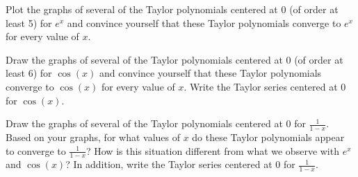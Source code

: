 \begin{activity} \label{8.5.Act3}
\ba
\item Plot the graphs of several of the Taylor polynomials centered at 0 (of order at least 5) for $e^x$ and convince yourself that these Taylor polynomials converge to $e^x$ for every value of $x$.
\item Draw the graphs of several of the Taylor polynomials centered at 0 (of order at least 6) for $\cos(x)$ and convince yourself that these Taylor polynomials converge to $\cos(x)$ for every value of $x$. Write the Taylor series centered at 0 for $\cos(x)$.
\item Draw the graphs of several of the Taylor polynomials centered at 0 for $\frac{1}{1-x}$. Based on your graphs, for what values of $x$  do these Taylor polynomials appear to converge to $\frac{1}{1-x}$? How is this situation different from what we observe with $e^x$ and $\cos(x)$?  In addition, write the Taylor series centered at 0 for $\frac{1}{1-x}$.
\ea


\end{activity}

